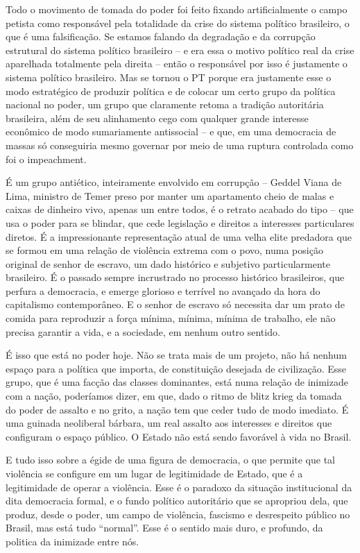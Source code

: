 Todo o movimento de tomada do poder foi feito fixando artificialmente o
campo petista como responsável pela totalidade da crise do sistema
político brasileiro, o que é uma falsificação. Se estamos falando da
degradação e da corrupção estrutural do sistema político brasileiro -- e
era essa o motivo político real da crise aparelhada totalmente pela
direita -- então o responsável por isso é justamente o sistema político
brasileiro. Mas se tornou o PT porque era justamente esse o modo
estratégico de produzir política e de colocar um certo grupo da política
nacional no poder, um grupo que claramente retoma a tradição autoritária
brasileira, além de seu alinhamento cego com qualquer grande interesse
econômico de modo sumariamente antissocial -- e que, em uma democracia
de massas só conseguiria mesmo governar por meio de uma ruptura
controlada como foi o impeachment.

É um grupo antiético, inteiramente envolvido em corrupção -- Geddel
Viana de Lima, ministro de Temer preso por manter um apartamento cheio
de malas e caixas de dinheiro vivo, apenas um entre todos, é o retrato
acabado do tipo -- que usa o poder para se blindar, que cede legislação
e direitos a interesses particulares diretos. É a impressionante
representação atual de uma velha elite predadora que se formou em uma
relação de violência extrema com o povo, numa posição original de senhor
de escravo, um dado histórico e subjetivo particularmente brasileiro. É
o passado sempre incrustrado no processo histórico brasileiros, que
perfura a democracia, e emerge glorioso e terrível no avançado da hora
do capitalismo contemporâneo. E o senhor de escravo só necessita dar um
prato de comida para reproduzir a força mínima, mínima, mínima de
trabalho, ele não precisa garantir a vida, e a sociedade, em nenhum
outro sentido.

É isso que está no poder hoje. Não se trata mais de um projeto, não há
nenhum espaço para a política que importa, de constituição desejada de
civilização. Esse grupo, que é uma facção das classes dominantes, está
numa relação de inimizade com a nação, poderíamos dizer, em que, dado o
ritmo de blitz krieg da tomada do poder de assalto e no grito, a nação
tem que ceder tudo de modo imediato. É uma guinada neoliberal bárbara,
um real assalto aos interesses e direitos que configuram o espaço
público. O Estado não está sendo favorável à vida no Brasil.

E tudo isso sobre a égide de uma figura de democracia, o que permite que
tal violência se configure em um lugar de legitimidade de Estado, que é
a legitimidade de operar a violência. Esse é o paradoxo da situação
institucional da dita democracia formal, e o fundo político autoritário
que se apropriou dela, que produz, desde o poder, um campo de violência,
fascismo e desrespeito público no Brasil, mas está tudo ``normal''. Esse
é o sentido mais duro, e profundo, da politica da inimizade entre nós.

